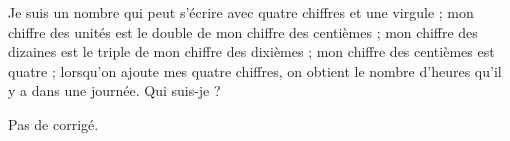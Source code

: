\begin{exercice*}
    Je suis un nombre qui peut s'écrire avec quatre chiffres et une virgule ; mon chiffre des unités est le double de mon chiffre des centièmes ; mon chiffre des dizaines est le triple de mon chiffre des dixièmes ; mon chiffre des centièmes est quatre ; lorsqu'on ajoute mes quatre chiffres, on obtient le nombre d'heures qu'il y a dans une journée. Qui suis-je ?
 \end{exercice*}
\begin{corrige}
  Pas de corrigé.
\end{corrige}
